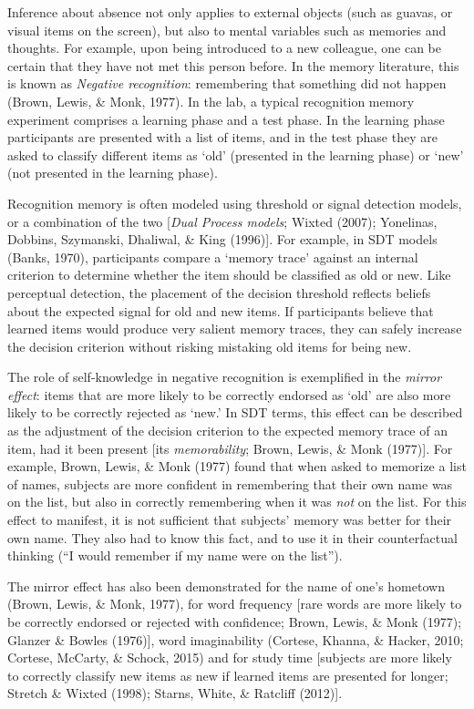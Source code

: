 \documentclass[12pt,twoside]{reedthesis}
\begin{document}
Inference about absence not only applies to external objects (such as guavas, or visual items on the screen), but also to mental variables such as memories and thoughts. For example, upon being introduced to a new colleague, one can be certain that they have not met this person before. In the memory literature, this is known as \emph{Negative recognition}: remembering that something did not happen (Brown, Lewis, \& Monk, 1977). In the lab, a typical recognition memory experiment comprises a learning phase and a test phase. In the learning phase participants are presented with a list of items, and in the test phase they are asked to classify different items as `old' (presented in the learning phase) or `new' (not presented in the learning phase).

Recognition memory is often modeled using threshold or signal detection models, or a combination of the two {[}\emph{Dual Process models}; Wixted (2007); Yonelinas, Dobbins, Szymanski, Dhaliwal, \& King (1996){]}. For example, in SDT models (Banks, 1970), participants compare a `memory trace' against an internal criterion to determine whether the item should be classified as old or new. Like perceptual detection, the placement of the decision threshold reflects beliefs about the expected signal for old and new items. If participants believe that learned items would produce very salient memory traces, they can safely increase the decision criterion without risking mistaking old items for being new.

The role of self-knowledge in negative recognition is exemplified in the \emph{mirror effect}: items that are more likely to be correctly endorsed as `old' are also more likely to be correctly rejected as `new.' In SDT terms, this effect can be described as the adjustment of the decision criterion to the expected memory trace of an item, had it been present {[}its \emph{memorability}; Brown, Lewis, \& Monk (1977){]}. For example, Brown, Lewis, \& Monk (1977) found that when asked to memorize a list of names, subjects are more confident in remembering that their own name was on the list, but also in correctly remembering when it was \emph{not} on the list. For this effect to manifest, it is not sufficient that subjects' memory was better for their own name. They also had to know this fact, and to use it in their counterfactual thinking (``I would remember if my name were on the list'').

The mirror effect has also been demonstrated for the name of one's hometown (Brown, Lewis, \& Monk, 1977), for word frequency {[}rare words are more likely to be correctly endorsed or rejected with confidence; Brown, Lewis, \& Monk (1977); Glanzer \& Bowles (1976){]}, word imaginability (Cortese, Khanna, \& Hacker, 2010; Cortese, McCarty, \& Schock, 2015) and for study time {[}subjects are more likely to correctly classify new items as new if learned items are presented for longer; Stretch \& Wixted (1998); Starns, White, \& Ratcliff (2012){]}.
\end{document}
